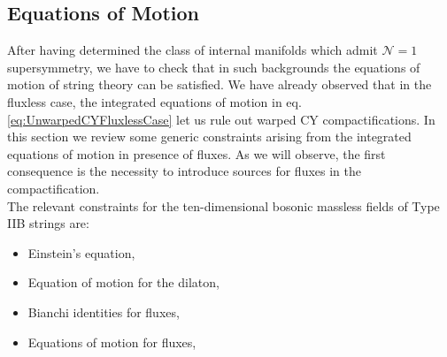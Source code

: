 \documentclass[12pt,a4paper]{book}
\begin{document}
\subsection{Equations of Motion}
\label{ssec:EqOfMotion}

After having determined the class of internal manifolds which admit $\mathcal{N} = 1$ supersymmetry, we have to check that in such backgrounds the equations of motion of string theory can be satisfied. We have already observed that in the fluxless case, the integrated equations of motion in eq. \eqref{eq:UnwarpedCYFluxlessCase} let us rule out warped CY compactifications. In this section we review some generic constraints arising from the integrated equations of motion in presence of fluxes. As we will observe, the first consequence is the necessity to introduce sources for fluxes in the compactification.\\

The relevant constraints for the ten-dimensional bosonic massless fields of Type IIB strings are:
\begin{itemize}
 \item Einstein's equation,
 \item Equation of motion for the dilaton,
 \item Bianchi identities for fluxes,
 \item Equations of motion for fluxes,
 \end{itemize}
\end{document}
